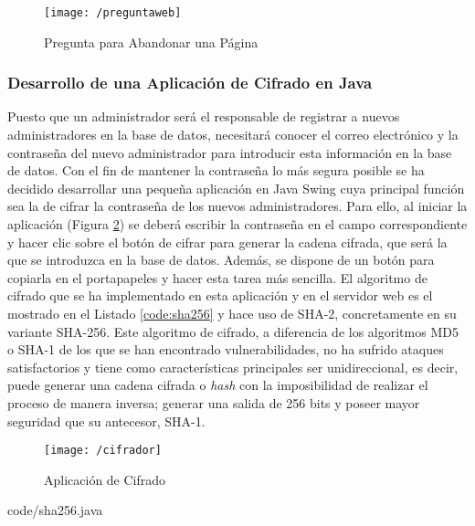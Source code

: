 \begin{figure}[!h]
	\begin{center}
		\texttt{[image: /preguntaweb]}
		\caption{Pregunta para Abandonar una Página}
		\label{fig:preguntaweb}
	\end{center}
\end{figure}

\subsubsection{Desarrollo de una Aplicación de Cifrado en Java}
Puesto que un administrador será el responsable de registrar a nuevos administradores en la base de datos, necesitará conocer el correo electrónico y la contraseña del nuevo administrador para introducir esta información en la base de datos. Con el fin de mantener la contraseña lo más segura posible se ha decidido desarrollar una pequeña aplicación en Java Swing cuya principal función sea la de cifrar la contraseña de los nuevos administradores. Para ello, al iniciar la aplicación (Figura \ref{fig:cifrador}) se deberá escribir la contraseña en el campo correspondiente y hacer clic sobre el botón de cifrar para generar la cadena cifrada, que será la que se introduzca en la base de datos. Además, se dispone de un botón para copiarla en el portapapeles y hacer esta tarea más sencilla. El algoritmo de cifrado que se ha implementado en esta aplicación y en el servidor web es el mostrado en el Listado \ref{code:sha256} y hace uso de SHA-2, concretamente en su variante SHA-256. Este algoritmo de cifrado, a diferencia de los algoritmos MD5 o SHA-1 de los que se han encontrado vulnerabilidades, no ha sufrido ataques satisfactorios y tiene como características principales ser unidireccional, es decir, puede generar una cadena cifrada o \textit{hash} con la imposibilidad de realizar el proceso de manera inversa; generar una salida de 256 bits y poseer mayor seguridad que su antecesor, SHA-1.

\begin{figure}[!h]
	\begin{center}
		\texttt{[image: /cifrador]}
		\caption{Aplicación de Cifrado}
		\label{fig:cifrador}
	\end{center}
\end{figure}

\clearpage


						{code/sha256.java}

